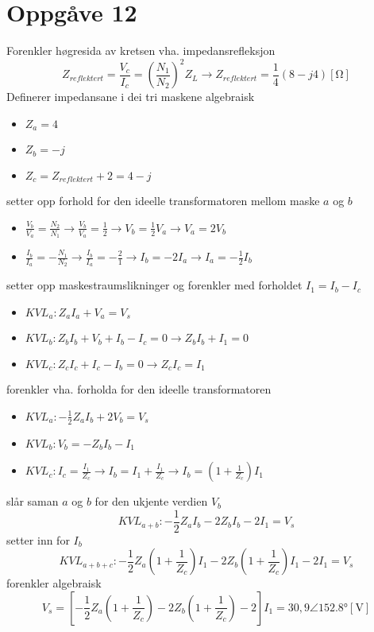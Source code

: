 \documentclass[12pt,a4paper]{article}
\begin{document}
  \newpage

  \section*{Oppgåve 12}
    Forenkler høgresida av kretsen vha. impedansrefleksjon
    \begin{equation}
      Z_{reflektert} = \frac{V_c}{I_c} = \left( \frac{N_1}{N_2} \right) ^2 Z_L
      \rightarrow Z_{reflektert} = \frac{1}{4}(8-j4) [\si{\ohm}]
    \end{equation}
    Definerer impedansane i dei tri maskene algebraisk
    \begin{itemize}
      \item $Z_a = 4$
      \item $Z_b = -j$
      \item $Z_c = Z_{reflektert} + 2 = 4-j$
    \end{itemize}
    setter opp forhold for den ideelle transformatoren mellom maske $a$ og $b$
    \begin{itemize}
      \item $\frac{V_b}{V_a} = \frac{N_2}{N_1}
        \rightarrow \frac{V_b}{V_a} = \frac{1}{2} 
        \rightarrow V_b = \frac{1}{2}V_a
        \rightarrow V_a = 2V_b$
      \item $\frac{I_b}{I_a} = -\frac{N_1}{N_2}
        \rightarrow \frac{I_b}{I_a} = -\frac{2}{1}
        \rightarrow I_b = -2I_a
        \rightarrow I_a = -\frac{1}{2}I_b$
    \end{itemize}
    setter opp maskestraumslikninger og forenkler med forholdet $I_1 = I_b - I_c$
    \begin{itemize}
      \item $KVL_a : Z_aI_a +V_a = V_s$
      \item $KVL_b : Z_bI_b +V_b +I_b - I_c = 0 \rightarrow Z_bI_b + I_1 = 0$
      \item $KVL_c : Z_cI_c + I_c - I_b = 0 \rightarrow Z_cI_c = I_1$
    \end{itemize}
    forenkler vha. forholda for den ideelle transformatoren
    \begin{itemize}
      \item $KVL_a : -\frac{1}{2}Z_aI_b +2V_b = V_s$
      \item $KVL_b : V_b = -Z_bI_b - I_1$
      \item $KVL_c : I_c = \frac{I_1}{Z_c} \rightarrow I_b = I_1 + \frac{I_1}{Z_c}
        \rightarrow I_b = (1+\frac{1}{Z_c})I_1$
    \end{itemize}
    slår saman $a$ og $b$ for den ukjente verdien $V_b$
    \begin{equation}
      KVL_{a+b}:-\frac{1}{2}Z_aI_b -2Z_bI_b - 2I_1 = V_s
    \end{equation}
    setter inn for $I_b$
    \begin{equation}
      KVL_{a+b+c}:-\frac{1}{2}Z_a(1+\frac{1}{Z_c})I_1 -2Z_b(1+\frac{1}{Z_c})I_1 - 2I_1 = V_s
    \end{equation}
    forenkler algebraisk
    \begin{equation}
      V_s = \left[-\frac{1}{2}Z_a(1+\frac{1}{Z_c}) -2Z_b(1+\frac{1}{Z_c}) - 2\right]I_1
      = 30,9\angle\ang{152,8} [\si{\volt}]
    \end{equation}
\end{document}
